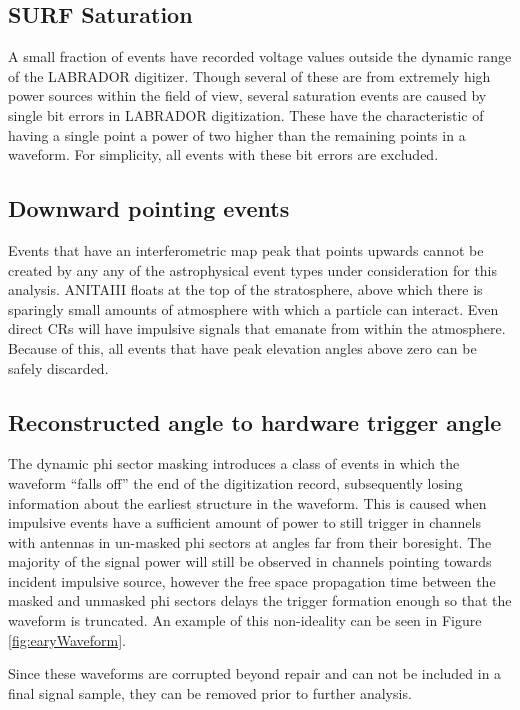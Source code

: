 	\subsection{SURF Saturation}
		A small fraction of events have recorded voltage values outside the dynamic range of the LABRADOR digitizer.  Though several of these are from extremely high power sources within the field of view, several saturation events are caused by single bit errors in LABRADOR digitization.  These have the characteristic of having a single point a power of two higher than the remaining points in a waveform.  For simplicity, all events with these bit errors are excluded.
		
		
	\subsection{Downward pointing events}
		Events that have an interferometric map peak that points upwards cannot be created by any any of the astrophysical event types under consideration for this analysis.  ANITAIII floats at the top of the stratosphere, above which there is sparingly small amounts of atmosphere with which a particle can interact.  Even direct CRs will have impulsive signals that emanate from within the atmosphere.  Because of this, all events that have peak elevation angles above zero can be safely discarded.
		
	
	\subsection{Reconstructed angle to hardware trigger angle}
		The dynamic phi sector masking introduces a class of events in which the waveform ``falls off'' the end of the digitization record, subsequently losing information about the earliest structure in the waveform.  This is caused when impulsive events have a sufficient amount of power to still trigger in channels with antennas in un-masked phi sectors at angles far from their boresight.  The majority of the signal power will still be observed in channels pointing towards incident impulsive source, however the free space propagation time between the masked and unmasked phi sectors delays the trigger formation enough so that the waveform is truncated.  An example of this non-ideality can be seen in Figure \ref{fig:earyWaveform}.
		
		Since these waveforms are corrupted beyond repair and can not be included in a final signal sample, they can be removed prior to further analysis.
		

